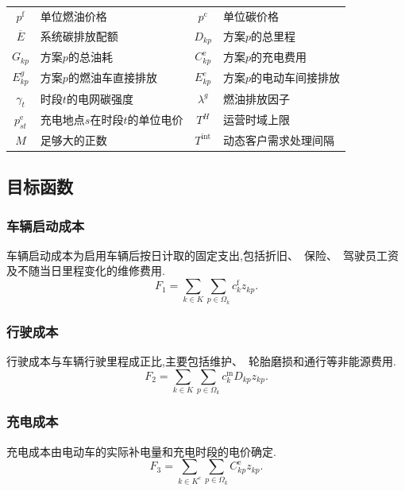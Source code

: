 \documentclass{setp-new}
\begin{document}
\begin{xltabular}{\linewidth}{@{}c>{\RaggedRight\arraybackslash}Xc>{\RaggedRight\arraybackslash}X@{}}
$p^{\mathrm f}$ & 单位燃油价格 & $p^{\mathrm c}$ & 单位碳价格\\
$\overline E$ & 系统碳排放配额 & $D_{kp}$ & 方案$p$的总里程\\
$G_{kp}$ & 方案$p$的总油耗 & $C_{kp}^{\mathrm e}$ & 方案$p$的充电费用\\
$E_{kp}^{g}$ & 方案$p$的燃油车直接排放 & $E_{kp}^{e}$ & 方案$p$的电动车间接排放\\
$\gamma_t$ & 时段$t$的电网碳强度 & $\lambda^{g}$ & 燃油排放因子\\
$p_{st}^{\mathrm e}$ & 充电地点$s$在时段$t$的单位电价 & $T^{H}$ & 运营时域上限\\
$M$ & 足够大的正数 & $T^{\mathrm{int}}$ & 动态客户需求处理间隔\\
\end{xltabular}
\endgroup

\subsection{目标函数}

\subsubsection{车辆启动成本}

车辆启动成本为启用车辆后按日计取的固定支出,包括折旧、~保险、~驾驶员工资及不随当日里程变化的维修费用.
\begin{equation}
F_1=\sum_{k\in K}\sum_{p\in\Omega_k}c_k^{\mathrm f}z_{kp}.
\label{eq:unified-f1}
\end{equation}

\subsubsection{行驶成本}

行驶成本与车辆行驶里程成正比,主要包括维护、~轮胎磨损和通行等非能源费用.
\begin{equation}
F_2=\sum_{k\in K}\sum_{p\in\Omega_k}c_k^{\mathrm m}D_{kp}z_{kp}.
\label{eq:unified-f2}
\end{equation}

\subsubsection{充电成本}

充电成本由电动车的实际补电量和充电时段的电价确定.
\begin{equation}
F_3=\sum_{k\in K^{e}}\sum_{p\in\Omega_k}C_{kp}^{\mathrm e}z_{kp}.
\label{eq:unified-f3}
\end{equation}
\end{document}
